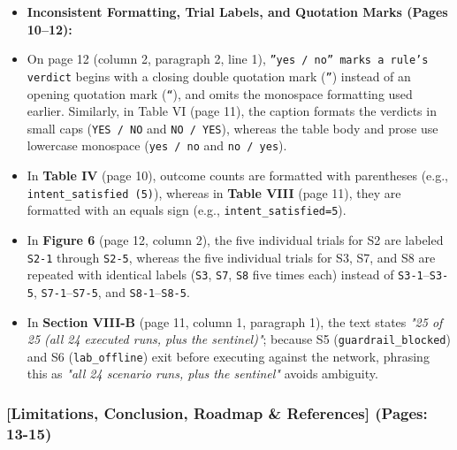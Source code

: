 \documentclass[11pt,a4paper]{article}
\begin{document}
\begin{itemize}[leftmargin=1.8em,itemsep=2pt]
\item \textbf{Inconsistent Formatting, Trial Labels, and Quotation Marks (Pages 10–12):}
\item On page 12 (column 2, paragraph 2, line 1), \texttt{”yes / no” marks a rule’s verdict} begins with a closing double quotation mark (\texttt{”}) instead of an opening quotation mark (\texttt{“}), and omits the monospace formatting used earlier. Similarly, in Table VI (page 11), the caption formats the verdicts in small caps (\texttt{YES / NO} and \texttt{NO / YES}), whereas the table body and prose use lowercase monospace (\texttt{yes / no} and \texttt{no / yes}).
\item In \textbf{Table IV} (page 10), outcome counts are formatted with parentheses (e.g., \texttt{intent\_satisfied (5)}), whereas in \textbf{Table VIII} (page 11), they are formatted with an equals sign (e.g., \texttt{intent\_satisfied=5}).
\item In \textbf{Figure 6} (page 12, column 2), the five individual trials for S2 are labeled \texttt{S2-1} through \texttt{S2-5}, whereas the five individual trials for S3, S7, and S8 are repeated with identical labels (\texttt{S3}, \texttt{S7}, \texttt{S8} five times each) instead of \texttt{S3-1}–\texttt{S3-5}, \texttt{S7-1}–\texttt{S7-5}, and \texttt{S8-1}–\texttt{S8-5}.
\item In \textbf{Section VIII-B} (page 11, column 1, paragraph 1), the text states \emph{"25 of 25 (all 24 executed runs, plus the sentinel)"}; because S5 (\texttt{guardrail\_blocked}) and S6 (\texttt{lab\_offline}) exit before executing against the network, phrasing this as \emph{"all 24 scenario runs, plus the sentinel"} avoids ambiguity.
\end{itemize}
\subsubsection*{[Limitations, Conclusion, Roadmap \& References] (Pages: 13-15)}
\end{document}
